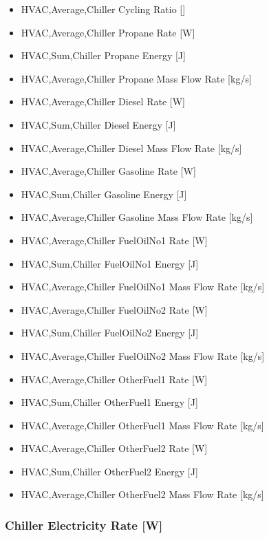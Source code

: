 \begin{itemize}
    \item
    HVAC,Average,Chiller Cycling Ratio {[]}
    \item
    HVAC,Average,Chiller Propane Rate {[}W{]}
    \item
    HVAC,Sum,Chiller Propane Energy {[}J{]}
    \item
    HVAC,Average,Chiller Propane Mass Flow Rate {[}kg/s{]}
    \item
    HVAC,Average,Chiller Diesel Rate {[}W{]}
    \item
    HVAC,Sum,Chiller Diesel Energy {[}J{]}
    \item
    HVAC,Average,Chiller Diesel Mass Flow Rate {[}kg/s{]}
    \item
    HVAC,Average,Chiller Gasoline Rate {[}W{]}
    \item
    HVAC,Sum,Chiller Gasoline Energy {[}J{]}
    \item
    HVAC,Average,Chiller Gasoline Mass Flow Rate {[}kg/s{]}
    \item
    HVAC,Average,Chiller FuelOilNo1 Rate {[}W{]}
    \item
    HVAC,Sum,Chiller FuelOilNo1 Energy {[}J{]}
    \item
    HVAC,Average,Chiller FuelOilNo1 Mass Flow Rate {[}kg/s{]}
    \item
    HVAC,Average,Chiller FuelOilNo2 Rate {[}W{]}
    \item
    HVAC,Sum,Chiller FuelOilNo2 Energy {[}J{]}
    \item
    HVAC,Average,Chiller FuelOilNo2 Mass Flow Rate {[}kg/s{]}
    \item
    HVAC,Average,Chiller OtherFuel1 Rate {[}W{]}
    \item
    HVAC,Sum,Chiller OtherFuel1 Energy {[}J{]}
    \item
    HVAC,Average,Chiller OtherFuel1 Mass Flow Rate {[}kg/s{]}
    \item
    HVAC,Average,Chiller OtherFuel2 Rate {[}W{]}
    \item
    HVAC,Sum,Chiller OtherFuel2 Energy {[}J{]}
    \item
    HVAC,Average,Chiller OtherFuel2 Mass Flow Rate {[}kg/s{]}
\end{itemize}

\subsubsection{Chiller Electricity Rate {[}W{]}}\label{chiller-electric-power-w}

